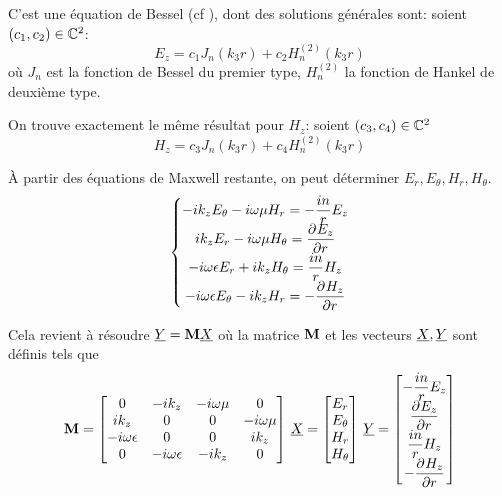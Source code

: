     C'est une équation de Bessel (cf \cite[eq (6.80)]{bowman_introduction_1958}), dont des solutions générales sont: soient $(c_1,c_2) \in \CC^2$:
    \begin{equation}
        E_z = c_1 J_n\left(k_3r\right) + c_2 H_n^{(2)}\left(k_3r\right)
    \end{equation}
    où $J_n$ est la fonction de Bessel du premier type, $H_n^{(2)}$ la fonction de Hankel de deuxième type. 

    On trouve exactement le même résultat pour $H_z$: soient $(c_3,c_4) \in \CC^2$
    \begin{equation}
        H_z = c_3 J_n\left(k_3r\right) + c_4 H_n^{(2)}\left(k_3r\right)
    \end{equation}

    À partir des équations de Maxwell restante, on peut déterminer $E_r,E_\theta,H_r,H_\theta$.
    \begin{equation}
        \left\lbrace
        \begin{matrix}
            -ik_zE_\theta - i\w\mu H_r = -\frac{in}{r}E_z
            \\
            ik_zE_r - i\w\mu H_\theta = \ddr{r}{E_z}
            \\
            -i\w\eps E_r + ik_z H_\theta = \frac{in}{r}H_z
            \\
            -i\w\eps E_\theta - ik_z H_r = -\ddr{r}{H_z}
        \end{matrix}
        \right.
    \end{equation}

    Cela revient à résoudre $\v{Y}= \mat{M}\v{X}$ où la matrice $\mat{M}$ et les vecteurs $\v{X}, \v{Y}$ sont définis tels que
    \begin{equation}
        \mat{M} =
        \begin{bmatrix}
        0 & -ik_z & -i\w\mu & 0 
        \\
        ik_z & 0 & 0 & -i\w\mu
        \\
        -i\w\eps & 0 & 0 & ik_z
        \\
        0 & -i\w\eps & -ik_z & 0
        \end{bmatrix}
        \,
        \v{X} = 
        \begin{bmatrix}
            E_r\\
            E_\theta\\
            H_r\\
            H_\theta
        \end{bmatrix}
        \,
        \v{Y} = 
        \begin{bmatrix}
            -\frac{in}{r}E_z\\
            \ddr{r}{E_z}\\
            \frac{in}{r}H_z\\
            -\ddr{r}{H_z}
        \end{bmatrix}
    \end{equation}

